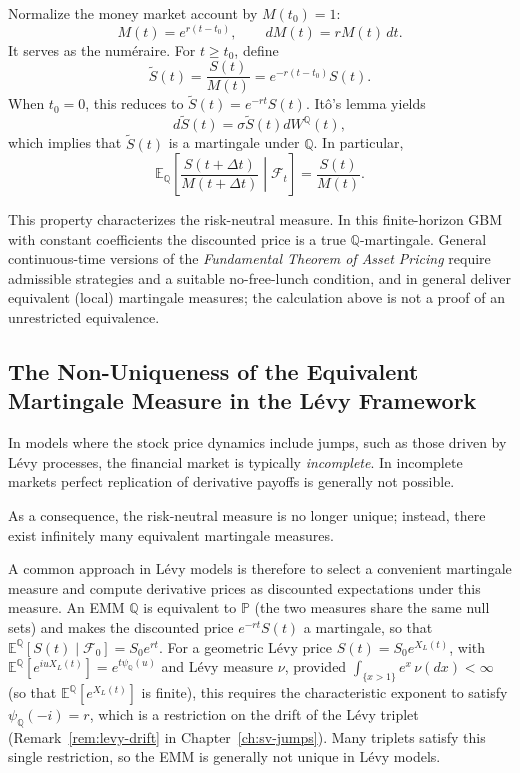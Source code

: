 Normalize the money market account by $M(t_0)=1$:
\[
M(t)=e^{r(t-t_0)},\qquad dM(t)=rM(t)\,dt.
\]
It serves as the num\'eraire. For $t\ge t_0$, define
\[
\tilde S(t)=\frac{S(t)}{M(t)}=e^{-r(t-t_0)}S(t).
\]
When $t_0=0$, this reduces to $\tilde S(t)=e^{-rt}S(t)$.
Itô's lemma yields
\[
d\tilde S(t)=\sigma\tilde S(t)dW^{\mathbb Q}(t),
\]
which implies that $\tilde S(t)$ is a martingale under $\mathbb Q$. In particular,
\[
\mathbb{E}_{\mathbb{Q}}
\!\left[
\frac{S(t+\Delta t)}{M(t+\Delta t)}
\middle|
\mathcal{F}_t
\right]
=
\frac{S(t)}{M(t)}.
\]

\par
This property characterizes the risk-neutral measure. In this finite-horizon GBM with constant coefficients the discounted price is a true $\mathbb Q$-martingale. General continuous-time versions of the \emph{Fundamental Theorem of Asset Pricing} require admissible strategies and a suitable no-free-lunch condition, and in general deliver equivalent (local) martingale measures; the calculation above is not a proof of an unrestricted equivalence.
\subsection{The Non-Uniqueness of the Equivalent Martingale Measure in the Lévy Framework}\label{sec:levy-emm}

In models where the stock price dynamics include jumps, such as those driven by Lévy processes, the financial market is typically \emph{incomplete}. In incomplete markets perfect replication of derivative payoffs is generally not possible.

As a consequence, the risk-neutral measure is no longer unique; instead, there exist infinitely many equivalent martingale measures.

A common approach in Lévy models is therefore to select a convenient martingale measure and compute derivative prices as discounted expectations under this measure.
An EMM $\mathbb Q$ is equivalent to $\mathbb P$ (the two measures share the same null sets) and makes the discounted price $e^{-rt}S(t)$ a martingale, so that $\mathbb E^{\mathbb Q}[S(t)\mid\mathcal F_0]=S_0e^{rt}$. For a geometric L\'evy price $S(t)=S_0e^{X_L(t)}$, with $\mathbb E^{\mathbb Q}[e^{iuX_L(t)}]=e^{t\psi_{\mathbb Q}(u)}$ and L\'evy measure $\nu$, provided $\int_{\{x>1\}} e^{x}\,\nu(dx)<\infty$ (so that $\mathbb E^{\mathbb Q}[e^{X_L(t)}]$ is finite), this requires the characteristic exponent to satisfy $\psi_{\mathbb Q}(-i)=r$, which is a restriction on the drift of the L\'evy triplet (Remark~\ref{rem:levy-drift} in Chapter~\ref{ch:sv-jumps}). Many triplets satisfy this single restriction, so the EMM is generally not unique in L\'evy models.

